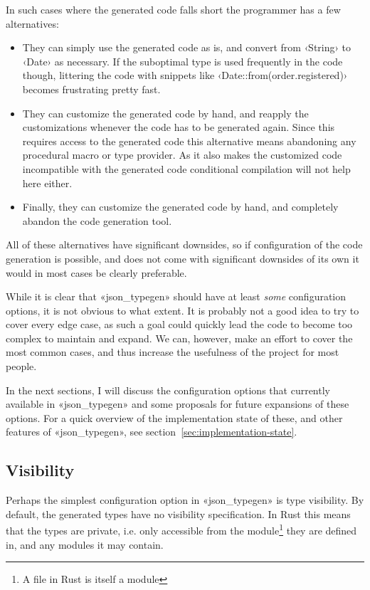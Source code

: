 In such cases where the generated code falls short the programmer has a few alternatives:

\begin{itemize}
  \item They can simply use the generated code as is, and convert from ‹String› to ‹Date› as necessary. If the suboptimal type is used frequently in the code though, littering the code with snippets like ‹Date::from(order.registered)› becomes frustrating pretty fast.
  \item They can customize the generated code by hand, and reapply the customizations whenever the code has to be generated again. Since this requires access to the generated code this alternative means abandoning any procedural macro or type provider. As it also makes the customized code incompatible with the generated code conditional compilation will not help here either.
  \item Finally, they can customize the generated code by hand, and completely abandon the code generation tool.
\end{itemize}

All of these alternatives have significant downsides, so if configuration of the code generation is possible, and does not come with significant downsides of its own it would in most cases be clearly preferable.

While it is clear that «json_typegen» should have at least \emph{some} configuration options, it is not obvious to what extent. It is probably not a good idea to try to cover every edge case, as such a goal could quickly lead the code to become too complex to maintain and expand. We can, however, make an effort to cover the most common cases, and thus increase the usefulness of the project for most people.

In the next sections, I will discuss the configuration options that currently available in «json_typegen» and some proposals for future expansions of these options. For a quick overview of the implementation state of these, and other features of «json_typegen», see section~\ref{sec:implementation-state}.

\subsection{Visibility}
\label{sec:visibility}

Perhaps the simplest configuration option in «json_typegen» is type visibility. By default, the generated types have no visibility specification. In Rust this means that the types are private, i.e. only accessible from the module\footnote{A file in Rust is itself a module} they are defined in, and any modules it may contain.

